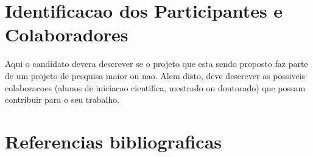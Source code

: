 \documentclass[a4paper,11pt]{article}
\begin{document}
\section{Identificacao dos Participantes e Colaboradores}
Aqui o candidato devera descrever se o projeto que esta sendo proposto faz parte de um projeto de pesquisa maior ou nao. Alem disto, deve descrever as possiveis colaboracoes (alunos de iniciacao cientifica, mestrado ou doutorado) que possam contribuir para o seu trabalho. 

\section{Referencias bibliograficas}


\end{document}
